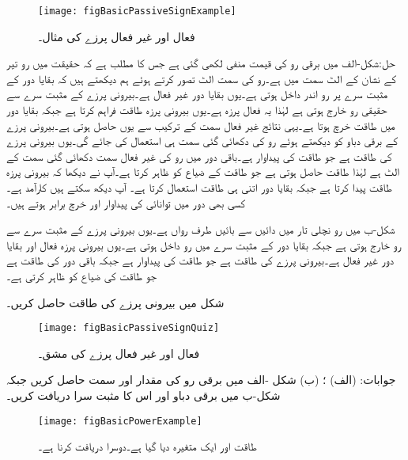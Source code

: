 \begin{figure}
\centering
\texttt{[image: figBasicPassiveSignExample]}
\caption{فعال اور غیر فعال پرزے کی مثال۔}
\label{شکل_بنیادی_فعال_غیر_فعال_مثال}
\end{figure}

حل:شکل-الف میں برقی رو کی قیمت منفی لکھی گئی ہے جس کا مطلب ہے کہ حقیقت میں رو تیر کے نشان کے الٹ سمت میں ہے۔رو کی سمت الٹ تصور کرتے ہوئے ہم دیکھتے ہیں کہ بقایا دور کے مثبت سرے پر رو اندر داخل ہوتی ہے۔یوں بقایا دور غیر فعال ہے۔بیرونی پرزے کے مثبت سرے سے حقیقی رو خارج ہوتی ہے لہٰذا یہ فعال پرزہ ہے۔یوں بیرونی پرزہ طاقت فراہم کرتا ہے جبکہ بقایا دور میں طاقت خرچ ہوتا ہے۔یہی نتائج غیر فعال سمت کے ترکیب سے یوں حاصل ہوتی ہے۔بیرونی پرزے کے برقی دباو کو دیکھتے ہوئے رو کی دکھائی گئی سمت ہی استعمال کی جائے گی۔یوں بیرونی پرزے کی طاقت  ہے جو طاقت کی پیداوار ہے۔باقی دور میں رو کی غیر فعال سمت دکھائی گئی سمت کے الٹ ہے لہٰذا طاقت  حاصل ہوتی ہے جو طاقت کے ضیاع کو ظاہر کرتا ہے۔آپ نے دیکھا کہ بیرونی پرزہ  طاقت پیدا کرتا ہے جبکہ بقایا دور اتنی ہی طاقت استعمال کرتا ہے۔ آپ دیکھ سکتے ہیں  کارآمد ہے۔کسی بھی دور میں توانائی کی پیداوار اور خرچ برابر ہوتے ہیں۔

شکل-ب میں رو نچلی تار میں دائیں سے بائیں طرف رواں ہے۔یوں بیرونی پرزے کے مثبت سرے سے رو خارج ہوتی ہے جبکہ بقایا دور کے مثبت سرے میں رو داخل ہوتی ہے۔یوں بیرونی پرزہ فعال اور بقایا دور غیر فعال ہے۔بیرونی پرزے کی طاقت  ہے جو طاقت کی پیداوار ہے جبکہ باقی دور کی طاقت  ہے جو طاقت کی ضیاع کو ظاہر کرتی ہے۔

شکل  میں بیرونی پرزے کی طاقت حاصل کریں۔

\begin{figure}
\centering
\texttt{[image: figBasicPassiveSignQuiz]}
\caption{فعال اور غیر فعال پرزے کی مشق۔}
\label{شکل_بنیادی_فعال_غیر_فعال_مشق}
\end{figure}

جوابات: (الف) ؛ (ب) 
شکل -الف میں برقی رو کی مقدار اور سمت حاصل کریں جبکہ شکل-ب میں برقی دباو اور اس کا مثبت سرا دریافت کریں۔
\begin{figure}
\centering
\texttt{[image: figBasicPowerExample]}
\caption{طاقت اور ایک متغیرہ دیا گیا ہے۔دوسرا دریافت کرنا ہے۔}
\label{شکل_بنیادی_طاقت_مثال}
\end{figure}

